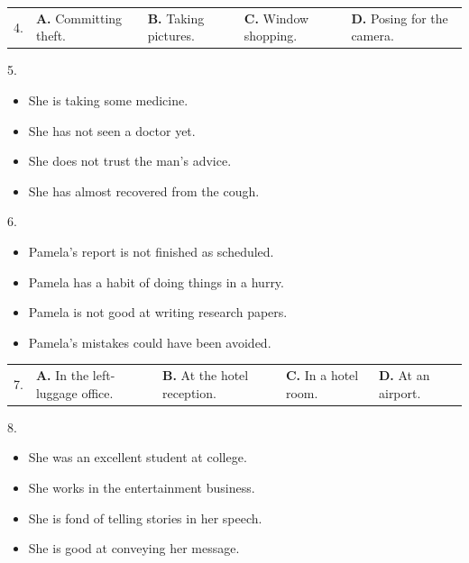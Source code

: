 \documentclass[UTF8,11pt]{ctexart}
\begin{document}
\noindent\begin{tabularx}{\linewidth}{@{}lXXXX@{}}4. & \textbf{A.} Committing theft. & \textbf{B.} Taking pictures. & \textbf{C.} Window shopping. & \textbf{D.} Posing for the camera.\\\end{tabularx}\par

5.


\begin{itemize}[leftmargin=2em,itemsep=.2em,topsep=.4em]\item[A.] She is taking some medicine.
\item[B.] She has not seen a doctor yet.
\item[C.] She does not trust the man's advice.
\item[D.] She has almost recovered from the cough.
\end{itemize}

6.


\begin{itemize}[leftmargin=2em,itemsep=.2em,topsep=.4em]\item[A.] Pamela's report is not finished as scheduled.
\item[B.] Pamela has a habit of doing things in a hurry.
\item[C.] Pamela is not good at writing research papers.
\item[D.] Pamela's mistakes could have been avoided.
\end{itemize}

\noindent\begin{tabularx}{\linewidth}{@{}lXXXX@{}}7. & \textbf{A.} In the left-luggage office. & \textbf{B.} At the hotel reception. & \textbf{C.} In a hotel room. & \textbf{D.} At an airport.\\\end{tabularx}\par

8.


\begin{itemize}[leftmargin=2em,itemsep=.2em,topsep=.4em]\item[A.] She was an excellent student at college.
\item[B.] She works in the entertainment business.
\item[C.] She is fond of telling stories in her speech.
\item[D.] She is good at conveying her message.
\end{itemize}
\end{document}

